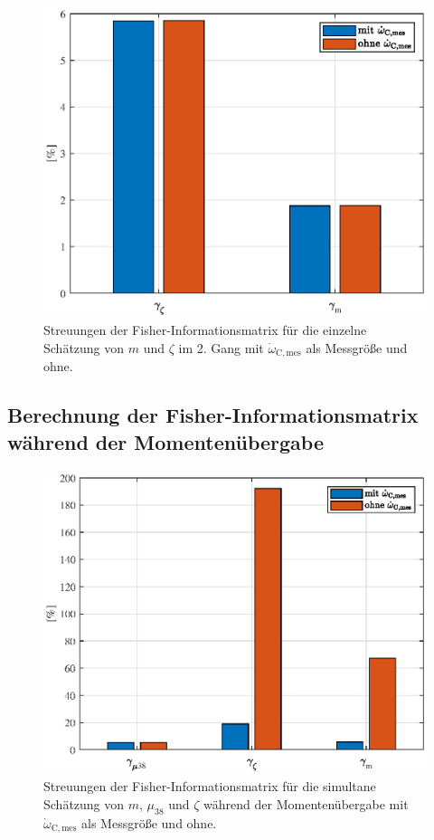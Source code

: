 \begin{figure}[ht]
  \centering
 \includegraphics[scale=0.9]{figures/03_Sensitivitaetsanalyse/03_Fisher_Info/Gang2/m_vs_zeta_einzeln.eps}
  \caption{Streuungen der Fisher-Informationsmatrix für die einzelne Schätzung von $m$ und $\zeta$ im 2. Gang mit $\dot{\omega}_\mathrm{C,mes}$ als Messgröße und ohne.}
\end{figure} 

\subsection{Berechnung der Fisher-Informationsmatrix während der Momentenübergabe}

\begin{figure}[ht]
  \centering
 \includegraphics[scale=0.9]{figures/03_Sensitivitaetsanalyse/03_Fisher_Info/Muebergabe/m_mu38_zeta.eps}
  \caption{Streuungen der Fisher-Informationsmatrix für die simultane Schätzung von $m$, $\mu_{38}$ und $\zeta$ während der Momentenübergabe mit $\dot{\omega}_\mathrm{C,mes}$ als Messgröße und ohne.}
\end{figure} 

